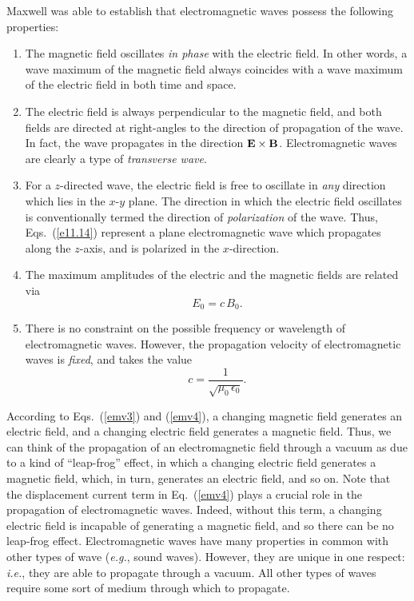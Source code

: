 Maxwell was able to establish that electromagnetic waves possess the
following properties:
\begin{enumerate}
\item The magnetic field oscillates {\em in phase} with the
electric
field. In other words, a wave maximum of the magnetic field always
coincides with a wave maximum of the electric field in both time and
space.
\item The electric field is always perpendicular to the magnetic field, and
both fields are directed at right-angles to the direction of propagation of
the wave. In fact, the wave propagates in the direction ${\bf E}\times{\bf B}$. 
Electromagnetic waves are clearly a type of {\em transverse wave}. 
\item For a $z$-directed wave, the electric field is free
to oscillate in {\em any}
direction which lies in the $x$-$y$ plane. The direction in which the
electric field oscillates is conventionally
termed the direction of {\em polarization}
of the wave. Thus, Eqs.~(\ref{e11.14}) represent a plane  electromagnetic wave which
propagates along the $z$-axis, and is polarized in the $x$-direction. 
\item The maximum amplitudes of the electric and the magnetic fields
are related via
\begin{equation}
E_0= c\,B_0.
\end{equation}
\item There is no constraint on the possible frequency or wavelength of
electromagnetic waves. However, the propagation velocity of
electromagnetic waves  is {\em fixed}, and takes the value
\begin{equation}\label{e11.18}
c = \frac{1}{\sqrt{\mu_0\,\epsilon_0}}.
\end{equation} 
\end{enumerate}

According to Eqs.~(\ref{emv3}) and (\ref{emv4}), a changing magnetic field generates an electric
field, and a changing electric field generates a magnetic field. 
Thus, we can think of the propagation of an electromagnetic field through a vacuum as due
to a kind of ``leap-frog'' effect, in which a changing electric field
generates a magnetic field, which, in turn, generates an electric field,
and so on. Note that the displacement current term in Eq.~(\ref{emv4}) plays
a crucial role in the propagation of electromagnetic waves. 
Indeed, without this term,
a changing electric field is incapable of generating
 a magnetic field, and so there can be no leap-frog effect. 
Electromagnetic waves have many properties in common with other
types of wave ({\em e.g.}, sound waves). However,  they are
unique in one respect: {\em i.e.}, they are able to propagate through a vacuum. All other types of
waves require some sort of medium through which to propagate. 

